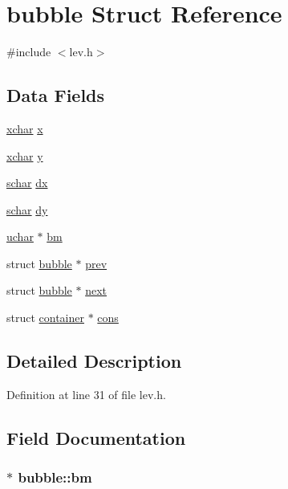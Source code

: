 \hypertarget{structbubble}{\section{bubble Struct Reference}
\label{structbubble}
}


{\ttfamily \#include $<$lev.\+h$>$}

\subsection*{Data Fields}
\begin{DoxyCompactItemize}
\item 
\hyperlink{global_8h_a2043b7d01ce89f4ee2fa6c345a752d32}{xchar} \hyperlink{structbubble_af7f9c88684a8f0b39df119b869f43daa}{x}
\item 
\hyperlink{global_8h_a2043b7d01ce89f4ee2fa6c345a752d32}{xchar} \hyperlink{structbubble_a5e49635e037d6587bfa6b7f977b0d77c}{y}
\item 
\hyperlink{config_8h_a0fd9ce9d735064461bebfe6037026093}{schar} \hyperlink{structbubble_aef4c454d2300774393c58a14a5f78988}{dx}
\item 
\hyperlink{config_8h_a0fd9ce9d735064461bebfe6037026093}{schar} \hyperlink{structbubble_ad0d5443c4c0c8774ee7acbb3a2a654b7}{dy}
\item 
\hyperlink{config_8h_a65f85814a8290f9797005d3b28e7e5fc}{uchar} $\ast$ \hyperlink{structbubble_aa4c214358b89b914833d9e4b840d4a17}{bm}
\item 
struct \hyperlink{structbubble}{bubble} $\ast$ \hyperlink{structbubble_a6c2ce0302072585c0362738cbe484c13}{prev}
\item 
struct \hyperlink{structbubble}{bubble} $\ast$ \hyperlink{structbubble_aef7d34c1e66aa80b038a11a71a06898b}{next}
\item 
struct \hyperlink{structcontainer}{container} $\ast$ \hyperlink{structbubble_ac3bc5856e3a28ea2e9249acd52019757}{cons}
\end{DoxyCompactItemize}


\subsection{Detailed Description}


Definition at line 31 of file lev.\+h.



\subsection{Field Documentation}
\hypertarget{structbubble_aa4c214358b89b914833d9e4b840d4a17}{
\subsubsection[{bm}]{$\ast$ bubble\+::bm}}\label{structbubble_aa4c214358b89b914833d9e4b840d4a17}


